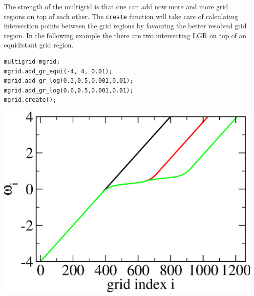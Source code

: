 The strength of the multigrid is that one can add now more and more grid regions on top of each other. The \texttt{create} function will take care of calculating intersection points between the grid regions by favouring the better resolved grid region. In the following example the there are two intersecting LGR on top of an equidistant grid region. 
\\
\vspace{1cm}
\noindent\begin{minipage}[l]{0.6\textwidth}
\begin{lstlisting}
multigrid mgrid;
mgrid.add_gr_equi(-4, 4, 0.01);
mgrid.add_gr_log(0.3,0.5,0.001,0.01);
mgrid.add_gr_log(0.6,0.5,0.001,0.01);
mgrid.create();
\end{lstlisting}
\end{minipage}
\begin{minipage}[]{0.4\textwidth}
	\includegraphics[width=1.0\textwidth]{pics/multigrid_02.eps}
\end{minipage}

